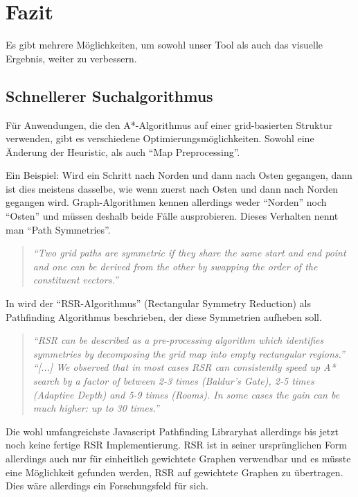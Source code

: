 \documentclass[letterpaper]{article}
\begin{document}

\section{Fazit}
	Es gibt mehrere Möglichkeiten, um sowohl unser Tool als auch das visuelle Ergebnis, weiter zu verbessern.

	\subsection{Schnellerer Suchalgorithmus}
		Für Anwendungen, die den A*-Algorithmus auf einer grid-basierten Struktur verwenden, gibt es verschiedene Optimierungsmöglichkeiten. Sowohl eine Änderung der Heuristic, als auch "`Map Preprocessing"'.

		Ein Beispiel: Wird ein Schritt nach Norden und dann nach Osten gegangen, dann ist dies meistens dasselbe, wie wenn  zuerst nach Osten und dann nach Norden gegangen wird. Graph-Algorithmen kennen allerdings weder "`Norden"' noch "`Osten"' und müssen deshalb beide Fälle ausprobieren.\cite[vgl.]{patel16} Dieses Verhalten nennt man "`Path Symmetries"'.

		\begin{quote}
			\textit{"`Two grid paths are symmetric if they share the same start and end point and one can be derived from the other by swapping the order of the constituent vectors."'}\cite[p. 1]{harabor12}
		\end{quote}

		In \cite{harabor12} wird der "`RSR-Algorithmus"' (Rectangular Symmetry Reduction) als Pathfinding Algorithmus beschrieben, der diese Symmetrien aufheben soll.\\

		\begin{quote}
			\textit{"`RSR can be described as a pre-processing algorithm which identifies symmetries by decomposing the grid map into empty rectangular regions."'}\cite[p. 2]{harabor12}\\

			\textit{"`[...] We observed that in most cases RSR can consistently speed up A* search by a factor of between 2-3 times (Baldur's Gate), 2-5 times (Adaptive Depth) and 5-9 times (Rooms). In some cases the gain can be much higher: up to 30 times."'}\cite[p. 4]{harabor12}
		\end{quote}

		Die wohl umfangreichste Javascript Pathfinding Library\footnotemark hat allerdings bis jetzt noch keine fertige RSR Implementierung. RSR ist in seiner ursprünglichen Form allerdings auch nur für einheitlich gewichtete Graphen verwendbar und es müsste eine Möglichkeit gefunden werden, RSR auf gewichtete Graphen zu übertragen. Dies wäre allerdings ein Forschungsfeld für sich.
\end{document}
